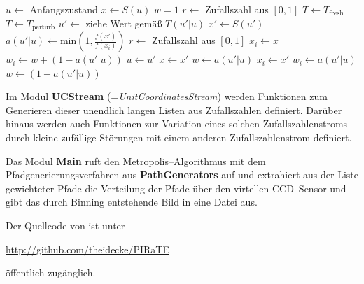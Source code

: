 	\begin{algorithmic}
		\STATE $u \leftarrow$ Anfangszustand
		\STATE $x \leftarrow S(u)$
		\STATE $w = 1$ 
			\STATE $r\leftarrow$ Zufallszahl aus $[0,1]$
				\STATE $T \leftarrow T_\text{fresh}$
				\STATE $T \leftarrow T_\text{perturb}$
			\ENDIF
			\STATE $u'\leftarrow$ ziehe Wert gemäß $T(u'|u)$
			\STATE $x' \leftarrow S(u')$
			\STATE $a(u'|u) \leftarrow \text{min}\left(1,\frac{f(x')}{f(x_i)}\right)$
			\STATE $r\leftarrow$ Zufallszahl aus $[0,1]$
				\STATE $x_i \leftarrow x$
			  \STATE $w_i \leftarrow w+(1-a(u'|u))$
				\STATE $u \leftarrow u'$
			  \STATE $x \leftarrow x'$
			  \STATE $w \leftarrow a(u'|u)$
			\ELSE
				\STATE $x_i \leftarrow x'$
				\STATE $w_i \leftarrow a(u'|u)$
				\STATE $w \leftarrow (1-a(u'|u))$
			\ENDIF
	  \ENDFOR
	  \STATE{}
	\end{algorithmic}
	
	Im Modul \textbf{UCStream} (={\em UnitCoordinatesStream}) werden Funktionen zum Generieren dieser unendlich langen Listen aus Zufallszahlen definiert. Darüber hinaus werden auch Funktionen zur Variation eines solchen Zufallszahlenstroms durch kleine zufällige Störungen mit einem anderen Zufallszahlenstrom definiert.
	
	Das Modul \textbf{Main} ruft den Metropolis--Algorithmus mit dem Pfadgenerierungsverfahren aus \textbf{PathGenerators} auf und extrahiert aus der Liste gewichteter Pfade die Verteilung der Pfade über den virtellen CCD--Sensor und gibt das durch Binning entstehende Bild in eine Datei aus.
	
	Der Quellcode von \pirate ist unter
	
	\url{http://github.com/theidecke/PIRaTE}
	
	öffentlich zugänglich.
	
	
	
	
	